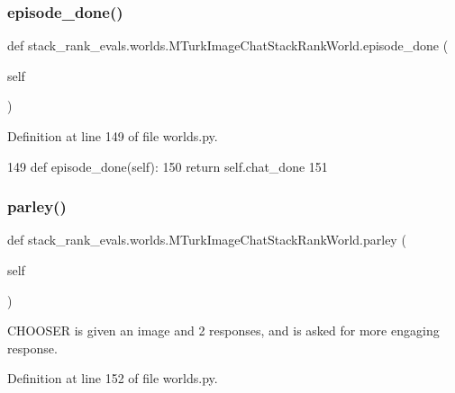 \subsubsection{\texorpdfstring{episode\+\_\+done()}{episode\_done()}}
{\footnotesize\ttfamily def stack\+\_\+rank\+\_\+evals.\+worlds.\+M\+Turk\+Image\+Chat\+Stack\+Rank\+World.\+episode\+\_\+done (\begin{DoxyParamCaption}\item[{}]{self }\end{DoxyParamCaption})}



Definition at line 149 of file worlds.\+py.


\begin{DoxyCode}
149     \textcolor{keyword}{def }episode\_done(self):
150         \textcolor{keywordflow}{return} self.chat\_done
151 
\end{DoxyCode}
\mbox{\label{classstack__rank__evals_1_1worlds_1_1MTurkImageChatStackRankWorld_ace7af06e8b400b73e2d122b00293ec69}} 
\subsubsection{\texorpdfstring{parley()}{parley()}}
{\footnotesize\ttfamily def stack\+\_\+rank\+\_\+evals.\+worlds.\+M\+Turk\+Image\+Chat\+Stack\+Rank\+World.\+parley (\begin{DoxyParamCaption}\item[{}]{self }\end{DoxyParamCaption})}

\begin{DoxyVerb}CHOOSER is given an image and 2 responses, and is asked for more engaging
response.
\end{DoxyVerb}
 

Definition at line 152 of file worlds.\+py.


